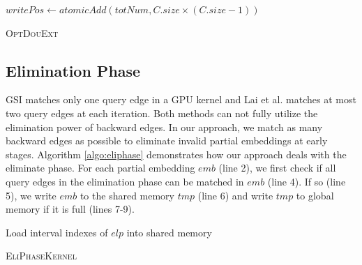 \begin{algorithm}
	$writePos \leftarrow atomicAdd(totNum,C.size \times (C.size-1))$\;
	\caption{\textsc{OptDouExt}}
	\label{algo:optDV}
\end{algorithm}

\subsection{Elimination Phase} \label{sec:eliphase}
GSI \cite{zeng2020gsi} matches only one query edge in a GPU kernel and Lai et al. \cite{lai2015scalable} matches at most two query edges at each iteration. Both methods can not fully utilize the elimination power of backward edges. In our approach, we match as many backward edges as possible to eliminate invalid partial embeddings at early stages. Algorithm \ref{algo:eliphase} demonstrates how our approach deals with the eliminate phase. For each partial embedding $emb$ (line 2), we first check if all query edges in the elimination phase can be matched in $emb$ (line 4). If so (line 5), we write $emb$ to the shared memory $tmp$ (line 6) and write $tmp$ to global memory if it is full (lines 7-9).
\begin{algorithm}
Load interval indexes of $elp$ into shared memory\;
\caption{\textsc{EliPhaseKernel}}
\label{algo:eliphase}
\end{algorithm}




